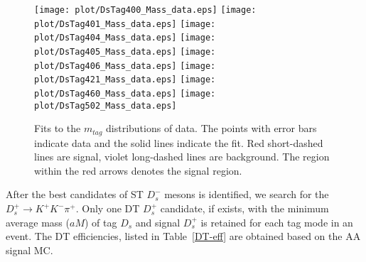 \documentclass[aps,prd,twocolumn,showpacs,amsmath,amssymb]{revtex4-1}
\begin{document}
\begin{figure*}[!htbp]
 \centering
 \texttt{[image: plot/DsTag400\_Mass\_data.eps]}
 \texttt{[image: plot/DsTag401\_Mass\_data.eps]}
 \texttt{[image: plot/DsTag404\_Mass\_data.eps]}
 \texttt{[image: plot/DsTag405\_Mass\_data.eps]}
 \texttt{[image: plot/DsTag406\_Mass\_data.eps]}
 \texttt{[image: plot/DsTag421\_Mass\_data.eps]}
 \texttt{[image: plot/DsTag460\_Mass\_data.eps]}
 \texttt{[image: plot/DsTag502\_Mass\_data.eps]}
 \caption{Fits to the $m_{tag}$ distributions of data. 
 The points with error bars indicate data and the solid lines indicate the fit. 
 Red short-dashed lines are signal, violet long-dashed lines are background. 
 The region within the red arrows denotes the signal region. 
 }
\label{SingleTagFit}
\end{figure*}

After the best candidates of ST $D_{s}^{-}$ mesons is identified, we search for the $D_{s}^{+} \rightarrow K^{+}K^{-}\pi^{+}$.
Only one DT $D_{s}^{+}$ candidate, if exists, with the minimum average mass ($aM$) of tag $D_{s}$ and signal $D_{s}^{+}$ is retained for each tag mode in an event.
The DT efficiencies, listed in Table~\ref{DT-eff} are obtained based on the AA signal MC.
\end{document}
